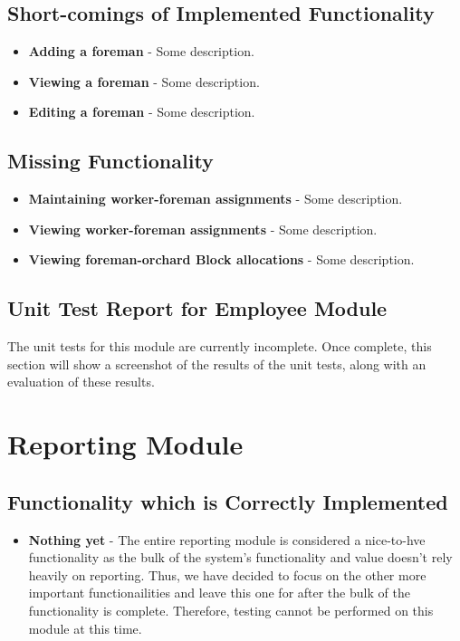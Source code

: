 \documentclass[11pt,fleqn]{book} %
\begin{document}
		\subsection{Short-comings of Implemented Functionality}
			\begin{itemize}
				\item\textbf{Adding a foreman} -
				Some description. 
				
				\item\textbf{Viewing a foreman} -
				Some description.
				
				\item\textbf{Editing a foreman} -
				Some description.
			\end{itemize}
		\subsection{Missing Functionality}
			\begin{itemize}
				\item\textbf{Maintaining worker-foreman assignments} -
				Some description.
				
				\item\textbf{Viewing worker-foreman assignments} -
				Some description.
				
				\item\textbf{Viewing foreman-orchard Block allocations} -
				Some description.
			\end{itemize}
		\subsection{Unit Test Report for Employee Module}
			The unit tests for this module are currently incomplete. Once complete, this section will show a screenshot of the results of the unit tests, along with an evaluation of these results.
			
	\section{Reporting Module}
		\subsection{Functionality which is Correctly Implemented}
			\begin{itemize}
				\item\textbf{Nothing yet} -
				The entire reporting module is considered a nice-to-hve functionality as the bulk of the system's functionality and value doesn't rely heavily on reporting. Thus, we have decided to focus on the other more important functionailities and leave this one for after the bulk of the functionality is complete. Therefore, testing cannot be performed on this module at this time.
			\end{itemize}
\end{document}
